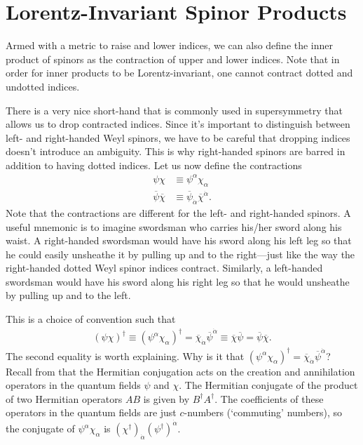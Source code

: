 \documentclass[12pt]{article}
\numberwithin{equation}{section}    %
\begin{document}
\section{Lorentz-Invariant Spinor Products}

Armed with a metric to raise and lower indices, we can also define the inner product of spinors as the contraction of upper and lower indices. Note that in order for inner products to be Lorentz-invariant, one cannot contract dotted and undotted indices. 

There is a very nice short-hand that is commonly used in supersymmetry that allows us to drop contracted indices. Since it's important to distinguish between left- and right-handed Weyl spinors, we have to be careful that dropping indices doesn't introduce an ambiguity. This is why right-handed spinors are barred in addition to having dotted indices. Let us now define the contractions
\begin{align}
	\psi\chi &\equiv \psi^\alpha\chi_\alpha\label{eq:susyalg:undotted}\\
	\overline\psi\overline\chi &\equiv \overline\psi_{\dot\alpha}\overline\chi^{\dot\alpha}\label{eq:susyalg:dot}.
\end{align}
Note that the contractions are different for the left- and right-handed spinors. A useful mnemonic is to imagine swordsman who carries his/her sword along his waist. A right-handed swordsman would have his sword along his left leg so that he could easily unsheathe it by pulling up and to the right---just like the way the right-handed dotted Weyl spinor indices contract. Similarly, a left-handed swordsman would have his sword along his right leg so that he would unsheathe by pulling up and to the left.

This is a choice of convention such that
\begin{align}
	(\psi\chi)^\dag \equiv (\psi^\alpha\chi_\alpha)^\dag = \overline\chi_{\dot\alpha}\overline\psi^{\dot\alpha} \equiv \overline\chi\overline\psi = \overline\psi\overline\chi.
\end{align}
The second equality is worth explaining. Why is it that $(\psi^\alpha\chi_\alpha)^\dag = \overline\chi_{\dot\alpha}\overline\psi^{\dot\alpha}$? Recall from that the Hermitian conjugation acts on the creation and annihilation operators in the quantum fields $\psi$ and $\chi$. The Hermitian conjugate of the product of two Hermitian operators $AB$ is given by $B^\dag A^\dag$. The coefficients of these operators in the quantum fields are just $c$-numbers (`commuting' numbers), so the conjugate of $\psi^\alpha\chi_\alpha$ is $\left(\chi^\dag\right)_{\dot\alpha}\left(\psi^\dag\right)^{\dot\alpha}$.
\end{document}
